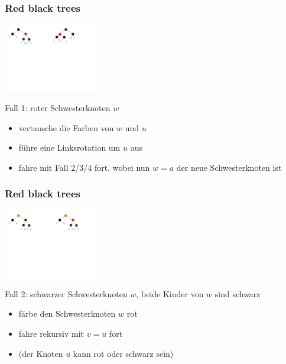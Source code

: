 \documentclass[aspectratio=1610, 11pt]{beamer}
\newcommand{\mytitle}{Red black trees}
\begin{document}
\begin{frame}\frametitle{\mytitle}
	\includegraphics[height=30mm]{./images/rbtree_del_1.pdf}\hfill\includegraphics[height=30mm]{./images/rbtree_del_1a.pdf}
	\begin{exampleblock}{Fall 1: roter Schwesterknoten $w$}
		\begin{itemize}
			\item vertausche die Farben von $w$ und $u$
			\item f\"uhre eine Linksrotation um $u$ aus
			\item fahre mit Fall 2/3/4 fort, wobei nun $w=a$ der neue Schwesterknoten ist
		\end{itemize}
	\end{exampleblock}
\end{frame}

\begin{frame}\frametitle{\mytitle}
	\includegraphics[height=30mm]{./images/rbtree_del_2.pdf}\hfill\includegraphics[height=30mm]{./images/rbtree_del_2a.pdf}
	\begin{exampleblock}{Fall 2: schwarzer Schwesterknoten $w$, beide Kinder von $w$ sind schwarz}
		\begin{itemize}
			\item f\"arbe den Schwesterknoten $w$ rot
			\item fahre rekursiv mit $v=u$ fort
			\item (der Knoten $u$ kann rot oder schwarz sein)
		\end{itemize}
	\end{exampleblock}
\end{frame}
\end{document}
